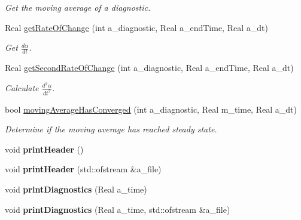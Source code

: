\begin{DoxyCompactItemize}
\begin{DoxyCompactList}\small\item\em Get the moving average of a diagnostic. \end{DoxyCompactList}\item 
\hypertarget{class_diagnostics_a7b5123f8f4ba2972d02f09026b7532c9}{Real \hyperlink{class_diagnostics_a7b5123f8f4ba2972d02f09026b7532c9}{get\-Rate\-Of\-Change} (int a\-\_\-diagnostic, Real a\-\_\-end\-Time, Real a\-\_\-dt)}\label{class_diagnostics_a7b5123f8f4ba2972d02f09026b7532c9}

\begin{DoxyCompactList}\small\item\em Get $ \frac{d \alpha}{d t} $. \end{DoxyCompactList}\item 
\hypertarget{class_diagnostics_a1785a5913fda81eb98c9f72a44aca154}{Real \hyperlink{class_diagnostics_a1785a5913fda81eb98c9f72a44aca154}{get\-Second\-Rate\-Of\-Change} (int a\-\_\-diagnostic, Real a\-\_\-end\-Time, Real a\-\_\-dt)}\label{class_diagnostics_a1785a5913fda81eb98c9f72a44aca154}

\begin{DoxyCompactList}\small\item\em Calculate $ \frac{d^2 \alpha}{dt^2} $. \end{DoxyCompactList}\item 
\hypertarget{class_diagnostics_a26cd9476e6f736d2fead8380db0f9fa2}{bool \hyperlink{class_diagnostics_a26cd9476e6f736d2fead8380db0f9fa2}{moving\-Average\-Has\-Converged} (int a\-\_\-diagnostic, Real m\-\_\-time, Real a\-\_\-dt)}\label{class_diagnostics_a26cd9476e6f736d2fead8380db0f9fa2}

\begin{DoxyCompactList}\small\item\em Determine if the moving average has reached steady state. \end{DoxyCompactList}\item 
\hypertarget{class_diagnostics_a2868f16188ebe067533afd6c0a27ff6a}{void {\bfseries print\-Header} ()}\label{class_diagnostics_a2868f16188ebe067533afd6c0a27ff6a}

\item 
\hypertarget{class_diagnostics_a69849023434b32047f39b51e0630f568}{void {\bfseries print\-Header} (std\-::ofstream \&a\-\_\-file)}\label{class_diagnostics_a69849023434b32047f39b51e0630f568}

\item 
\hypertarget{class_diagnostics_acd87da429ff720d80cbb2e82431fadb7}{void {\bfseries print\-Diagnostics} (Real a\-\_\-time)}\label{class_diagnostics_acd87da429ff720d80cbb2e82431fadb7}

\item 
\hypertarget{class_diagnostics_a510534ea0fa2b5e49f9f0aec1d7f8693}{void {\bfseries print\-Diagnostics} (Real a\-\_\-time, std\-::ofstream \&a\-\_\-file)}\label{class_diagnostics_a510534ea0fa2b5e49f9f0aec1d7f8693}

\end{DoxyCompactItemize}


